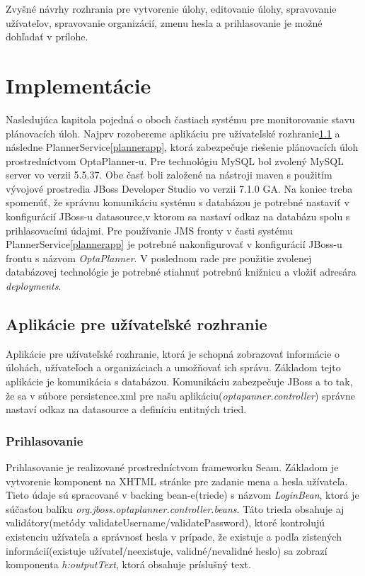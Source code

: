 Zvyšné návrhy rozhrania pre vytvorenie úlohy, editovanie úlohy, spravovanie užívateľov, spravovanie organizácií, zmenu hesla a prihlasovanie je možné dohľadať v prílohe.


\chapter{Implementácie}
Nasledujúca kapitola pojedná o oboch častiach systému pre monitorovanie stavu plánovacích úloh.  Najprv rozobereme aplikáciu pre užívateľské rozhranie\ref{approz} a následne PlannerService\ref{plannerapp}, ktorá zabezpečuje riešenie plánovacích úloh prostredníctvom OptaPlanner-u. Pre technológiu MySQL bol zvolený MySQL server vo verzii 5.5.37. Obe časť boli založené na nástroji maven s použitím vývojové prostredia JBoss Developer Studio vo verzii 7.1.0 GA. Na koniec treba spomenúť, že správnu komunikáciu systému s databázou je potrebné nastaviť v konfigurácií JBoss-u datasource\cite{jbossbook},v ktorom sa nastaví odkaz na databázu spolu s prihlasovacími údajmi. Pre používanie JMS fronty v časti systému PlannerService\ref{plannerapp} je potrebné nakonfigurovať v konfigurácií JBoss-u frontu s názvom \emph{OptaPlanner}. V poslednom rade pre použitie zvolenej databázovej technológie je potrebné stiahnuť potrebnú knižnicu a vložiť adresára \emph{deployments}.


\section{Aplikácie pre užívateľské rozhranie}\label{approz}
Aplikácie pre užívateľské rozhranie, ktorá je schopná zobrazovať informácie o úlohách, užívateľoch a organizáciach a umožňovať ich správu. Základom tejto aplikácie je komunikácia s databázou. Komunikáciu zabezpečuje JBoss a to tak, že sa v súbore persistence.xml pre našu aplikáciu(\emph{optapanner.controller}) správne nastaví odkaz na datasource a definíciu entitných tried.
	

\subsection{Prihlasovanie}
Prihlasovanie je realizované prostredníctvom frameworku Seam. Základom je vytvorenie komponent na XHTML stránke pre zadanie mena a hesla užívateľa. Tieto údaje sú spracované v backing bean-e(triede) s názvom \emph{LoginBean}, ktorá je súčasťou balíku \emph{org.jboss.optaplanner.controller.beans}. Táto trieda obsahuje aj validátory(metódy validateUsername/validatePassword), ktoré kontrolujú existenciu užívateľa a správnosť hesla v prípade, že existuje a podľa zistených informácií(existuje užívateľ/neexistuje, validné/nevalidné heslo) sa zobrazí komponenta \emph{h:outputText}, ktorá obsahuje príslušný text.

